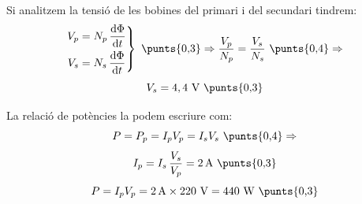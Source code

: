\begin{solapartat}
Si analitzem la tensió de les bobines del primari i del secundari tindrem:
\[ \left.\begin{aligned} V_p &= N_p\,\frac{\mathrm{d}\Phi}{\mathrm{d}t}\\ V_s &= N_s\,\frac{\mathrm{d}\Phi}{\mathrm{d}t}\end{aligned}\right\} \ \text{\punts{0,3}} \Rightarrow \frac{V_p}{N_p} = \frac{V_s}{N_s} \ \text{\punts{0,4}} \Rightarrow \]
\[ V_s = 4,4\ \mathrm{V} \ \text{\punts{0,3}} \]
\end{solapartat}

\begin{solapartat}
La relació de potències la podem escriure com:
\[ P = P_p = I_pV_p = I_sV_s \ \text{\punts{0,4}} \Rightarrow \]
\[ I_p = I_s\,\frac{V_s}{V_p} = 2\,\mathrm{A} \ \text{\punts{0,3}} \]
\[ P = I_pV_p = 2\,\mathrm{A}\times 220\ \mathrm{V} = 440\ \mathrm{W} \ \text{\punts{0,3}} \]
\end{solapartat}
